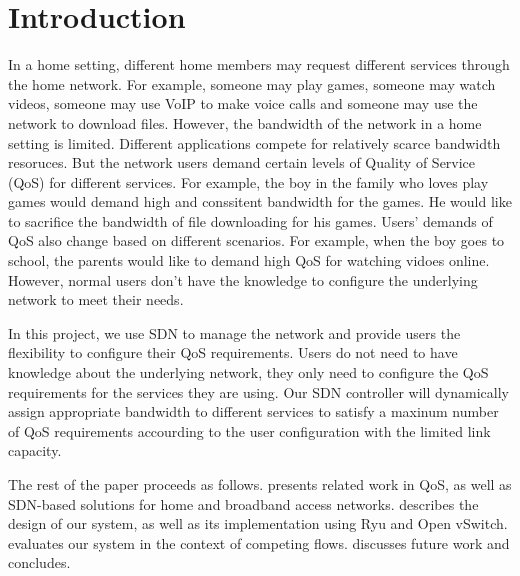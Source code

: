 \section{Introduction}
In a home setting, different home members may request different services through the home network. For example, someone may play games, someone may watch videos, someone may use VoIP to make voice calls and someone may use the network to download files.   
However, the bandwidth of the network in a home setting is limited. Different applications compete for relatively scarce bandwidth resoruces. But the network users demand certain levels of Quality of Service (QoS) for different services. For example, the boy in the family who loves play games would demand high and conssitent bandwidth for the games. He would like to sacrifice the bandwidth of file downloading for his games. 
Users' demands of QoS also change based on different scenarios. For example, when the boy goes to school, the parents would like to demand high QoS for watching vidoes online. However, normal users don't have the knowledge to configure the underlying network to meet their needs.

In this project, we use SDN to manage the network and provide users the flexibility to configure their QoS requirements. Users do not need to have knowledge about the underlying network, they only need to configure the QoS requirements for the services they are using. Our SDN controller will dynamically assign appropriate bandwidth to different services to satisfy a maxinum number of QoS requirements accourding to the user configuration with the limited link capacity. 

The rest of the paper proceeds as follows. 
 presents related work in QoS, as well as SDN-based solutions
for home and broadband access networks. 
 describes the design of our system, as well as its implementation using Ryu and Open vSwitch.
 evaluates
our system in the
context of competing flows.  discusses future work
and concludes.
